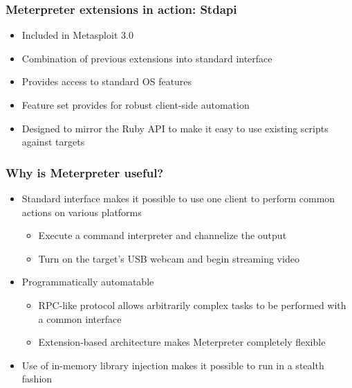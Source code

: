 \documentclass{beamer}
\newenvironment{sitemize}{\vspace{1mm}\begin{itemize}\itemsep 4pt\small}{\end{itemize}}
\begin{document}
\begin{frame}[t]
    \frametitle{Meterpreter extensions in action: Stdapi}

    \begin{sitemize}
        \item Included in Metasploit 3.0
        \item Combination of previous extensions into standard
        interface

        \pause
        \item Provides access to standard OS features

        \pause
        \item Feature set provides for robust client-side automation

        \pause
        \item Designed to mirror the Ruby API to make it easy to use
        existing scripts against targets
    \end{sitemize}
\end{frame}

%
%

\begin{frame}[t]
    \frametitle{Why is Meterpreter useful?}

    \begin{sitemize}
        \item Standard interface makes it possible to use one client
        to perform common actions on various platforms
        \begin{sitemize}
            \pause
            \item Execute a command interpreter and channelize the
            output

            \pause
            \item Turn on the target's USB webcam and begin
            streaming video
        \end{sitemize}

        \pause
        \item Programmatically automatable
        \begin{sitemize}
            \item RPC-like protocol allows arbitrarily complex tasks
            to be performed with a common interface
            \item Extension-based architecture makes Meterpreter
            completely flexible
        \end{sitemize}

        \pause
        \item Use of in-memory library injection makes it possible
        to run in a stealth fashion
    \end{sitemize}
\end{frame}
\end{document}
